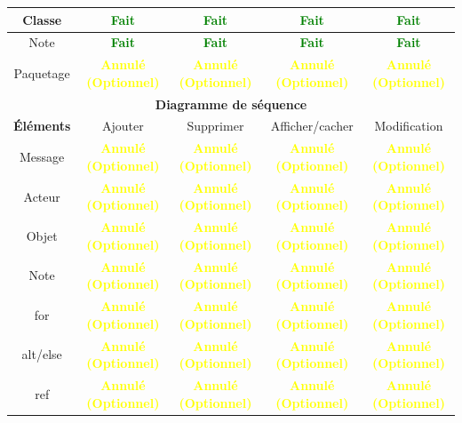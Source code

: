 \documentclass[hidelinks, a4paper,11pt,twoside,final]{article}
\begin{document}
\begin{tabular}{|c|c|c|c|c|}
    {Classe} & {\textcolor{green}{\textbf{Fait}}} & {\textcolor{green}{\textbf{Fait}}} & {\textcolor{green}{\textbf{Fait}}} & {\textcolor{green}{\textbf{Fait}}}\\\hline
    {Note} & {\textcolor{green}{\textbf{Fait}}} & {\textcolor{green}{\textbf{Fait}}} & {\textcolor{green}{\textbf{Fait}}} & {\textcolor{green}{\textbf{Fait}}}\\\hline
    {Paquetage} & {\textcolor{yellow}{\textbf{Annulé (Optionnel)}}} & {\textcolor{yellow}{\textbf{Annulé (Optionnel)}}} & {\textcolor{yellow}{\textbf{Annulé (Optionnel)}}} & {\textcolor{yellow}{\textbf{Annulé (Optionnel)}}}\\\hline
    \multicolumn{5}{|c|}{\textbf{Diagramme de séquence}}\\\hline
    {\textbf{Éléments}} & {Ajouter} & {Supprimer} & {Afficher/cacher} & {Modification} \\\hline
    {Message} & {\textcolor{yellow}{\textbf{Annulé (Optionnel)}}} & {\textcolor{yellow}{\textbf{Annulé (Optionnel)}}} & {\textcolor{yellow}{\textbf{Annulé (Optionnel)}}} & {\textcolor{yellow}{\textbf{Annulé (Optionnel)}}}\\\hline
    {Acteur} & {\textcolor{yellow}{\textbf{Annulé (Optionnel)}}} & {\textcolor{yellow}{\textbf{Annulé (Optionnel)}}} & {\textcolor{yellow}{\textbf{Annulé (Optionnel)}}} & {\textcolor{yellow}{\textbf{Annulé (Optionnel)}}}\\\hline
    {Objet} & {\textcolor{yellow}{\textbf{Annulé (Optionnel)}}} & {\textcolor{yellow}{\textbf{Annulé (Optionnel)}}} & {\textcolor{yellow}{\textbf{Annulé (Optionnel)}}} & {\textcolor{yellow}{\textbf{Annulé (Optionnel)}}}\\\hline
    {Note} & {\textcolor{yellow}{\textbf{Annulé (Optionnel)}}} & {\textcolor{yellow}{\textbf{Annulé (Optionnel)}}} & {\textcolor{yellow}{\textbf{Annulé (Optionnel)}}} & {\textcolor{yellow}{\textbf{Annulé (Optionnel)}}}\\\hline
    {for} & {\textcolor{yellow}{\textbf{Annulé (Optionnel)}}} & {\textcolor{yellow}{\textbf{Annulé (Optionnel)}}} & {\textcolor{yellow}{\textbf{Annulé (Optionnel)}}} & {\textcolor{yellow}{\textbf{Annulé (Optionnel)}}}\\\hline
    {alt/else} & {\textcolor{yellow}{\textbf{Annulé (Optionnel)}}} & {\textcolor{yellow}{\textbf{Annulé (Optionnel)}}} & {\textcolor{yellow}{\textbf{Annulé (Optionnel)}}} & {\textcolor{yellow}{\textbf{Annulé (Optionnel)}}}\\\hline
    {ref} & {\textcolor{yellow}{\textbf{Annulé (Optionnel)}}} & {\textcolor{yellow}{\textbf{Annulé (Optionnel)}}} & {\textcolor{yellow}{\textbf{Annulé (Optionnel)}}} & {\textcolor{yellow}{\textbf{Annulé (Optionnel)}}}\\\hline

\end{tabular}
\end{document}
